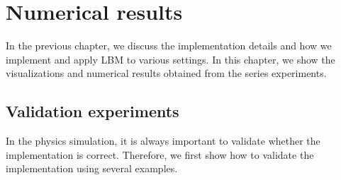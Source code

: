 \chapter{Numerical results}
\vspace{-8mm}
In the previous chapter, we discuss the implementation details
and how we implement and apply LBM to various settings.
In this chapter, we show the visualizations and numerical results
obtained from the series experiments.

\section{Validation experiments}
In the physics simulation, it is always important
to validate whether the implementation is correct.
Therefore, we first show how to validate the implementation
using several examples.

